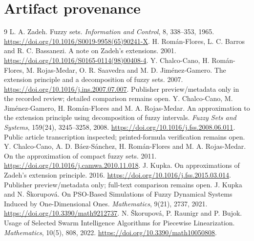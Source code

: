 \documentclass[10pt,a4paper]{article}
\begin{document}
\ifdefined\LayoutFixture\else
\appendix
\section{Artifact provenance}
\StudyEvidence
\fi

\begin{thebibliography}{9}\small
{} L. A. Zadeh. Fuzzy sets. \emph{Information and Control}, 8,
338--353, 1965. \url{https://doi.org/10.1016/S0019-9958(65)90241-X}.
 H. Román-Flores, L. C. Barros and R. C. Bassanezi. A note on Zadeh's
extensions. 2001. \url{https://doi.org/10.1016/S0165-0114(98)00408-4}.
 Y. Chalco-Cano, H. Román-Flores, M. Rojas-Medar,
O. R. Saavedra and M. D. Jiménez-Gamero. The extension
principle and a decomposition of fuzzy sets. 2007.
\url{https://doi.org/10.1016/j.ins.2007.07.007}. Publisher preview/metadata only
in the recorded review; detailed comparison remains open.
 Y. Chalco-Cano, M. Jiménez-Gamero, H. Román-Flores and
M. A. Rojas-Medar. An approximation to the extension principle using decomposition
of fuzzy intervals. \emph{Fuzzy Sets and Systems}, 159(24), 3245--3258, 2008.
\url{https://doi.org/10.1016/j.fss.2008.06.011}. Public article transcription
inspected; printed-formula verification remains open.
 Y. Chalco-Cano, A. D. Báez-Sánchez, H. Román-Flores and
M. A. Rojas-Medar. On the approximation of
compact fuzzy sets. 2011. \url{https://doi.org/10.1016/j.camwa.2010.11.018}.
 J. Kupka. On approximations of Zadeh's extension
principle. 2016. \url{https://doi.org/10.1016/j.fss.2015.03.014}.
Publisher preview/metadata only; full-text comparison remains open.
 J. Kupka and N. Škorupová. On PSO-Based Simulations of Fuzzy
Dynamical Systems Induced by One-Dimensional Ones. \emph{Mathematics},
9(21), 2737, 2021. \url{https://doi.org/10.3390/math9212737}.
 N. Škorupová, P. Raunigr and P. Bujok. Usage of Selected Swarm
Intelligence Algorithms for Piecewise Linearization. \emph{Mathematics},
10(5), 808, 2022. \url{https://doi.org/10.3390/math10050808}.
\end{thebibliography}
\end{document}
